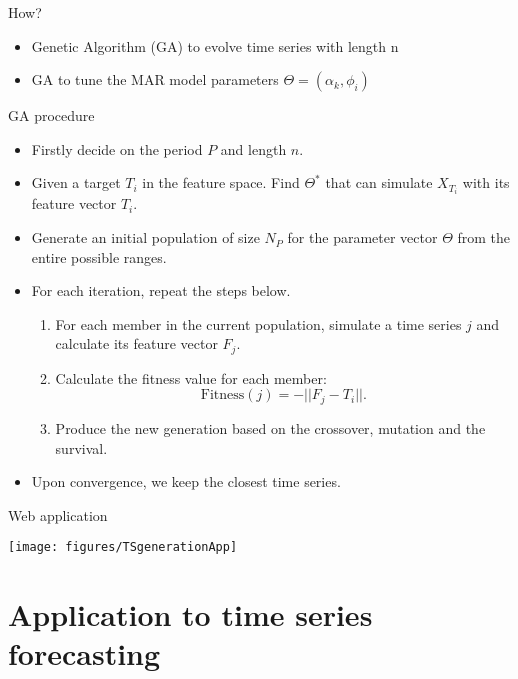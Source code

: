 \documentclass[12pt,ignorenonframetext,compress]{beamer}
\providecommand{\tightlist}{%
  \setlength{\itemsep}{0pt}\setlength{\parskip}{0pt}}
\begin{document}
\begin{frame}{How?}
  \begin{itemize}
  \tightlist
  \item
    Genetic Algorithm (GA) to evolve time series with length n
  \item
    GA to tune the MAR model parameters \(\Theta = (\alpha_k, \phi_i)\)
  \end{itemize}


\end{frame}

\begin{frame}{GA procedure}
\protect\hypertarget{ga-procedure}{}

\begin{itemize}
\tightlist
\item
  Firstly decide on the period \(P\) and length \(n\).
\item
  Given a target \(T_i\) in the feature space. Find \(\Theta^{*}\) that
  can simulate \(X_{T_i}\) with its feature vector \(T_i\).
\item
  Generate an initial population of size \(N_P\) for the parameter
  vector \(\Theta\) from the entire possible ranges.
\item
  For each iteration, repeat the steps below.

  \begin{enumerate}
  \tightlist
  \item
    For each member in the current population, simulate a time series
    \(j\) and calculate its feature vector \(F_j\).
  \item
    Calculate the fitness value for each member:
    \[\text{Fitness}(j) = - ||F_j-T_i||.\]
  \item
    Produce the new generation based on the crossover, mutation and the
    survival.
  \end{enumerate}
\item
  Upon convergence, we keep the closest time series.
\end{itemize}

\end{frame}

\begin{frame}{Web application}
\protect\hypertarget{section}{}

\centerline{\texttt{[image: figures/TSgenerationApp]}}

\end{frame}

\hypertarget{forecasting-based-on-features}{%
\section{Application to time series forecasting}\label{forecasting-based-on-features}}
\end{document}
